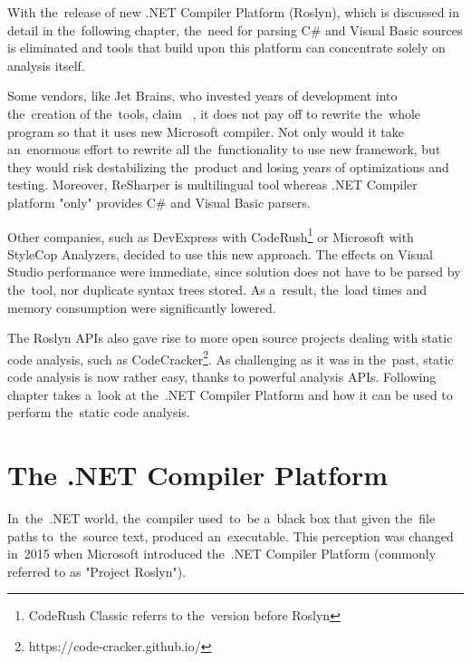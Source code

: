 \documentclass[
  digital, %
  table,   %
  lof,     %
  lot,     %
  oneside,
]{fithesis3}
\begin{document}
With the~release of new .NET Compiler Platform (Roslyn), which is discussed in detail in the~following chapter, the~need for parsing C\# and Visual Basic sources is eliminated and tools that build upon this platform can concentrate solely on analysis itself.

Some vendors, like Jet Brains, who invested years of development into the~creation of the~tools, claim ~\cite{resharper-and-roslyn-qa}, it does not pay off to rewrite the~whole program so that it uses new Microsoft compiler. Not only would it take an~enormous effort to rewrite all the~functionality to use new framework, but they would risk destabilizing the~product and losing years of optimizations and testing. Moreover, ReSharper is multilingual tool whereas .NET Compiler platform "only" provides C\# and Visual Basic parsers.

Other companies, such as DevExpress with CodeRush\footnote{CodeRush Classic referrs to the~version before Roslyn} or Microsoft with StyleCop Analyzers, decided to use this new approach. The effects on Visual Studio performance were immediate, since solution does not have to be parsed by the~tool, nor duplicate syntax trees stored. As a~result, the~load times and memory consumption were significantly lowered.

The Roslyn APIs also gave rise to more open source projects dealing with static code analysis, such as CodeCracker\footnote{https://code-cracker.github.io/}. As challenging as it was in the~past, static code analysis is now rather easy, thanks to powerful analysis APIs. Following chapter takes a~look at the~.NET Compiler Platform and how it can be used to perform the~static code analysis.

\chapter{The .NET Compiler Platform}
In~the~.NET world, the~compiler used~to~be a~black box that given the~file paths to~the~source text, produced an~executable. This perception was changed in~2015 when Microsoft introduced the~.NET Compiler Platform (commonly referred to as "Project Roslyn").  

\end{document}
